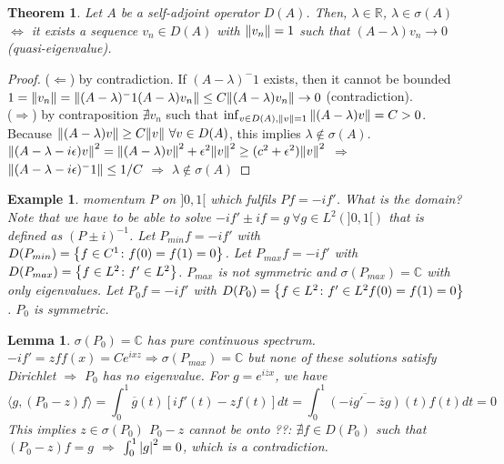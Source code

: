 \documentclass{article}
\newtheorem*{theorem}{Theorem}
\newtheorem*{lemma}{Lemma}
\newtheorem*{example}{Example}
\newcommand{\RR}{\mathbb{R}}
\newcommand{\CC}{\mathbb{C}}
\newcommand{\eps}{\epsilon}
\newcommand{\sig}{\sigma}
\newcommand{\la}{\lambda}
\renewcommand{\sp}[2]{\langle #1,#2 \rangle}
\begin{document}
\begin{theorem}
  Let $A$ be a self-adjoint operator $D(A)$. 
  Then, $\la \in \RR$, $\la \in \sig(A)$ $\Leftrightarrow$ it exists a sequence $v_n \in D(A)$ with $\norm{v_n} = 1$ such that $(A - \la) v_n \to 0$ (quasi-eigenvalue).
\end{theorem}

\begin{proof} 
  ($\Leftarrow$) by contradiction. If $(A - \la)^-1$ exists, then it cannot be bounded 
  $1 = \norm{v_n} = \norm{(A - \la)^-1 (A - \la) v_n} \le C \norm{(A - \la) v_n} \to 0$ (contradiction).
  \\
  ($\Rightarrow$) by contraposition
  $\nexists v_n$ such that $\inf_{v\in D(A),\norm{v} = 1} \norm{(A - \la)v} = C > 0$.
  Because $\norm{(A - \la) v} \ge C \norm{v} \ \forall v \in D(A)$, this implies $\la \notin \sig(A)$.
  $\norm{(A - \la - i \eps)v}^2 = \norm{(A - \la)v}^2 + \eps^2 \norm{v}^2 \ge (c^2 +\eps^2) \norm{v}^2$ 
  $\Rightarrow$ $\norm{(A - \la - i \eps)^-1} \le 1/C$ 
  $\Rightarrow$ $\la \notin \sig(A)$
\end{proof} 

\begin{example} 
  momentum $P$ on $]0,1[$ which fulfils $P f = - i f'$.
  What is the domain? 
  Note that we have to be able to solve $-i f' \pm i f = g \ \forall g \in L^2(]0,1[)$ that is defined as $(P \pm i)^{-1}$.
  Let $P_{min} f = - i f'$ with $D(P_{min}) = \qty{ f \in C^1 \colon f(0) = f(1) = 0 }$.
  Let $P_{max} f = - i f'$ with $D(P_{max}) = \qty{ f \in L^2 \colon f' \in L^2 }$.
  $P_{max}$ is not symmetric and $\sig(P_{max}) = \CC$ with only eigenvalues.
  Let $P_0 f = - i f'$ with  $D(P_0) = \qty{ f \in L^2 \colon f' \in L^2 f(0) = f(1) = 0 }$.
  $P_0$ is symmetric.
\end{example} 

\begin{lemma} 
  $\sig(P_0) = \CC$ has pure continuous spectrum.
  $- i f' = z f f(x) = C e^{ixz} \Rightarrow \sig(P_{max}) = \CC$ 
  but none of these solutions satisfy Dirichlet $\Rightarrow$ $P_0$ has no eigenvalue.
  For $g = e^{i\overline{z}x}$, we have 
  $$ \sp{g}{(P_0 - z)f} = \int_0^1 \overline{g}(t) [i f'(t) - z f(t)] dt = \int_0^1 \overline{(-i g'-\overline{z} g)}(t) f(t) dt = 0$$
  This implies $z \in \sig(P_0)$ 
  $P_0 - z$ cannot be onto ??: $\nexists f \in D(P_0)$ such that $(P_0 - z) f = g$ $\Rightarrow$ $\int_0^1 \abs{g}^2 = 0$, which is a contradiction.
\end{lemma}
\end{document}
